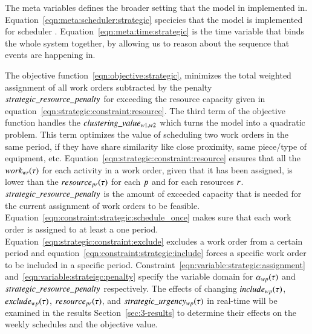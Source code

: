 The meta variables defines the broader setting that the model in implemented in.
Equation~\eqref{eqn:meta:scheduler:strategic} specicies that the model is
implemented for scheduler \ElementScheduler. 
Equation~\eqref{eqn:meta:time:strategic} is the time variable that binds the whole
system together, by allowing us to reason about the sequence that events are 
happening in.

The objective function~\eqref{eqn:objective:strategic}, minimizes the
total weighted assignment of all work orders subtracted by the penalty $
strategic\_resource\_penalty$ for exceeding the resource capacity given in
equation~\eqref{eqn:strategic:constraint:resource}. The third term of the
objective function handles the $clustering\_value_{w1, w2}$ which turns the model into
a quadratic problem. This term optimizes the value of scheduling two work orders
in the same period, if they have share similarity like close proximity, same
piece/type of equipment, etc. Equation~\eqref{eqn:strategic:constraint:resource}
ensures that all the $work_{wr}(\tau)$ for each activity in
a work order, given that it has been assigned, is lower than the $
\ParStrategicResource$ for each $p$ and for each resources $
r$. $strategic\_resource\_penalty$ is the amount of exceeded
capacity that is needed for the current assignment of work orders to be
feasible. Equation~\eqref{eqn:constraint:strategic:schedule_once} makes
sure that each work order is assigned to at least a one period. 
Equation~\eqref{eqn:strategic:constraint:exclude} excludes a work order from a
certain period and equation~\eqref{eqn:constraint:strategic:include}
forces a specific work order to be included in a specific
period. Constraint~\eqref{eqn:variable:strategic:assignment} 
and~\eqref{eqn:variable:strateigc:penalty} specify the variable domain for $
\alpha_{wp}(\tau)$ and
$ strategic\_resource\_penalty$ respectively. The effects of changing $
include_{wp}(\tau)$, $exclude_{wp}(\tau)$, $\ParStrategicResource$,
and $ strategic\_urgency_{w p}(\tau)$ in real-time will be examined in the results
Section~\ref{sec:3-results} to determine their effects on the weekly schedules
and the objective value.
